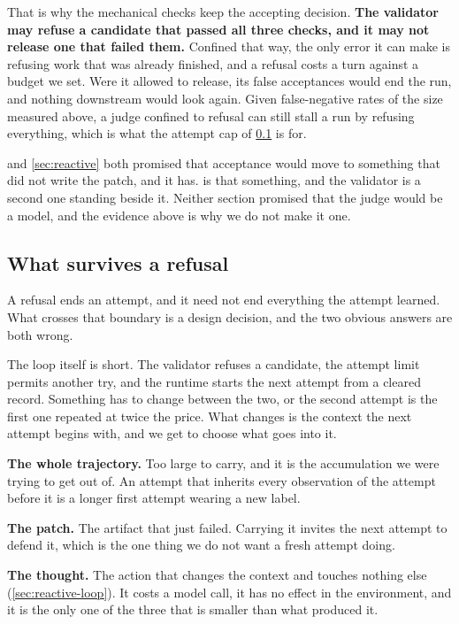 That is why the mechanical checks keep the accepting decision. \textbf{The validator may refuse a candidate that
passed all three checks, and it may not release one that failed them.} Confined that way, the only
error it can make is refusing work that was already finished, and a refusal costs a turn against a
budget we set. Were it allowed to release, its false acceptances would end the run, and nothing
downstream would look again. Given false-negative rates of the size measured above, a judge confined
to refusal can still stall a run by refusing everything, which is what the attempt cap of
\cref{sec:reflection} is for.

 and \cref{sec:reactive} both promised that acceptance would move to something that
did not write the patch, and it has.  is that something, and the validator is a
second one standing beside it. Neither section promised that the judge would be a model, and the
evidence above is why we do not make it one.

\subsection{What survives a refusal}
\label{sec:reflection}

A refusal ends an attempt, and it need not end everything the attempt learned. What crosses that
boundary is a design decision, and the two obvious answers are both wrong.

The loop itself is short. The validator refuses a candidate, the attempt limit permits another try,
and the runtime starts the next attempt from a cleared record. Something has to change between the
two, or the second attempt is the first one repeated at twice the price. What changes is the
context the next attempt begins with, and we get to choose what goes into it.

\bi

\item \textbf{The whole trajectory.} Too large to carry, and it is the accumulation we were trying
to get out of. An attempt that inherits every observation of the attempt before it is a longer first
attempt wearing a new label.

\item \textbf{The patch.} The artifact that just failed. Carrying it invites the next attempt to
defend it, which is the one thing we do not want a fresh attempt doing.

\item \textbf{The thought.} The action that changes the context and touches nothing else
(\cref{sec:reactive-loop}). It costs a model call, it has no effect in the environment, and it is
the only one of the three that is smaller than what produced it.

